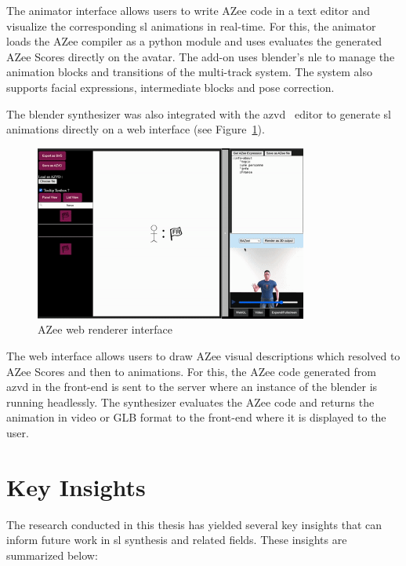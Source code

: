 \documentclass[../../main.tex]{subfiles}
\begin{document}
The animator interface allows users to write AZee code in a text editor and visualize the corresponding \gls{sl} animations in real-time. For this, the animator loads the AZee compiler as a python module and uses evaluates the generated AZee Scores directly on the avatar. The add-on uses blender's \gls{nle} to manage the animation blocks and transitions of the multi-track system. The system also supports facial expressions, intermediate blocks and pose correction.

The blender synthesizer was also integrated with the \gls{azvd}~\cite{filhol2024software} editor to generate \gls{sl} animations directly on a web interface (see Figure~\ref{fig:conclusion:azee_web_interface}).

\begin{figure}[ht]
    \centering
    \includegraphics[width=0.8\textwidth]{chapters/conclusion/images/azee_web_interface.png}
    \caption{AZee web renderer interface}
    \label{fig:conclusion:azee_web_interface}
\end{figure}

The web interface allows users to draw AZee visual descriptions which resolved to AZee Scores and then to animations. For this, the AZee code generated from \gls{azvd} in the front-end is sent to the server where an instance of the blender is running headlessly. The synthesizer evaluates the AZee code and returns the animation in video or GLB format to the front-end where it is displayed to the user.

\section{Key Insights}
\label{ch:conclusion:key_insights}

The research conducted in this thesis has yielded several key insights that can inform future work in \gls{sl} synthesis and related fields. These insights are summarized below:
\end{document}

